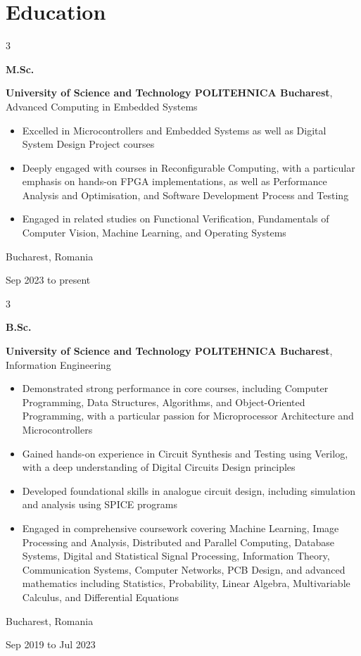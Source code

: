 \documentclass[10pt, letterpaper]{article}
\newenvironment{highlights}{
    \begin{itemize}[
        topsep=0.10 cm,
        parsep=0.10 cm,
        partopsep=0pt,
        itemsep=0pt,
        leftmargin=0.4 cm + 10pt
    ]
}{
    \end{itemize}
} %
\newenvironment{threecolentry}[3][]{
    \onecolentry
    \def\thirdColumn{#3}
    \setcolumnwidth{1 cm, \fill, 3.5 cm}
    \begin{paracol}{3}
    {\raggedright #2} \switchcolumn
}{
    \switchcolumn \raggedleft \thirdColumn
    \end{paracol}
    \endonecolentry
} %
\begin{document}
    
    \section{Education}



        
        \begin{threecolentry}{\textbf{M.Sc.}}{
            Bucharest, Romania

        Sep 2023 to present
        }
            \textbf{University of Science and Technology POLITEHNICA Bucharest}, Advanced Computing in Embedded Systems
            \begin{highlights}
                \item Excelled in Microcontrollers and Embedded Systems as well as Digital System Design Project courses
                \item Deeply engaged with courses in Reconfigurable Computing, with a particular emphasis on hands-on FPGA implementations, as well as Performance Analysis and Optimisation, and Software Development Process and Testing
                \item Engaged in related studies on Functional Verification, Fundamentals of Computer Vision, Machine Learning, and Operating Systems
            \end{highlights}
        \end{threecolentry}

        \vspace{0.2 cm}

        \begin{threecolentry}{\textbf{B.Sc.}}{
            Bucharest, Romania

        Sep 2019 to Jul 2023
        }
            \textbf{University of Science and Technology POLITEHNICA Bucharest}, Information Engineering
            \begin{highlights}
                \item Demonstrated strong performance in core courses, including Computer Programming, Data Structures, Algorithms, and Object-Oriented Programming, with a particular passion for Microprocessor Architecture and Microcontrollers
                \item Gained hands-on experience in Circuit Synthesis and Testing using Verilog, with a deep understanding of Digital Circuits Design principles
                \item Developed foundational skills in analogue circuit design, including simulation and analysis using SPICE programs
                \item Engaged in comprehensive coursework covering Machine Learning, Image Processing and Analysis, Distributed and Parallel Computing, Database Systems, Digital and Statistical Signal Processing, Information Theory, Communication Systems, Computer Networks, PCB Design, and advanced mathematics including Statistics, Probability, Linear Algebra, Multivariable Calculus, and Differential Equations
            \end{highlights}
        \end{threecolentry}
\end{document}

